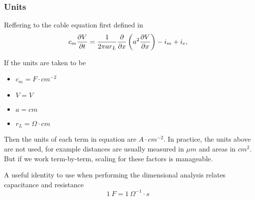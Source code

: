 \subsubsection{Units}
Reffering to the cable equation first defined in~
\begin{equation*}
    c_m \frac{\partial{V}}{\partial{t}} = \frac{1}{2\pi a r_{L}} \frac{\partial{}}{\partial{x}} \left( a^2 \frac{\partial{V}}{\partial{x}} \right) - i_m + i_e,
\end{equation*}

If the units are taken to be
\begin{itemize}
    \item $c_m = F\cdot cm^{-2}$
    \item $V = V$
    \item $a = cm$
    \item $r_L = \Omega\cdot cm$
\end{itemize}
Then the units of each term in equation are $A\cdot cm^{-2}$.
In practice, the units above are not used, for example distances are usually measured in $\mu m$ and areas in $cm^2$.
But if we work term-by-term, scaling for these factors is manageable.

A useful identity to use when performing the dimensional analysis relates capacitance and resistance
\begin{equation*}
    1~F = 1~\Omega^{-1} \cdot s
\end{equation*}

